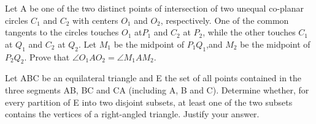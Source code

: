 \item Let A be one of the two distinct points of intersection of two unequal co-planar circles $C_1$ and $C_2$ with centers $O_1$ and $O_2$, respectively. One of the common tangents to the circles touches $O_1$ at$P_1$ and $C_2$ at $P_2$, while the other touches $C_1$ at $Q_1$ and $C_2$ at $Q_2.$ Let $M_1$ be the midpoint of $P_1Q_1$,and $M_2$ be the midpoint of $P_2Q_2.$ Prove that $\angle O_1AO_2 = \angle M_1AM_2.$

\item Let ABC be an equilateral triangle and E the set of all points contained in the three segments AB, BC and CA (including A, B and C). Determine whether, for every partition of E into two disjoint subsets, at least one of the two subsets contains the vertices of a right-angled triangle. Justify your answer.



